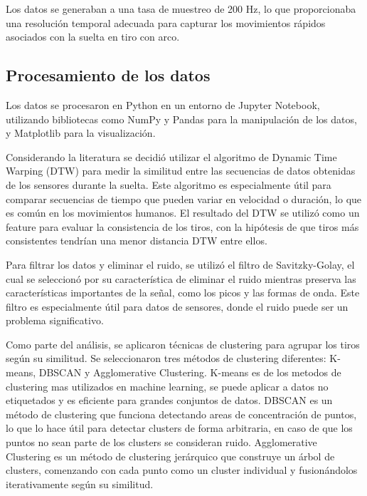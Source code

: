 \documentclass[11pt,a4paper,twocolumn,twoside]{rho-class/rho}
\begin{document}
        Los datos se generaban a una tasa de muestreo de 200 Hz, lo que proporcionaba una resolución temporal adecuada para capturar los movimientos rápidos asociados con la suelta en tiro con arco.


    \subsection{Procesamiento de los datos}

        Los datos se procesaron en Python en un entorno de Jupyter Notebook, utilizando bibliotecas como NumPy y Pandas para la manipulación de los datos, y Matplotlib para la visualización.

        Considerando la literatura se decidió utilizar el algoritmo de Dynamic Time Warping (DTW) para medir la similitud entre las secuencias de datos obtenidas de los sensores durante la suelta. Este algoritmo es especialmente útil para comparar secuencias de tiempo que pueden variar en velocidad o duración, lo que es común en los movimientos humanos. El resultado del DTW se utilizó como un feature para evaluar la consistencia de los tiros, con la hipótesis de que tiros más consistentes tendrían una menor distancia DTW entre ellos.

        Para filtrar los datos y eliminar el ruido, se utilizó el filtro de Savitzky-Golay, el cual se seleccionó por su característica de eliminar el ruido mientras preserva las características importantes de la señal, como los picos y las formas de onda. Este filtro es especialmente útil para datos de sensores, donde el ruido puede ser un problema significativo. \cite{konstantinovskyIntroductionSavitzkyGolayFilter2024}

        Como parte del análisis, se aplicaron técnicas de clustering para agrupar los tiros según su similitud. Se seleccionaron tres métodos de clustering diferentes: K-means, DBSCAN y Agglomerative Clustering.
        K-means es de los metodos de clustering mas utilizados en machine learning, se puede aplicar a datos no etiquetados y es eficiente para grandes conjuntos de datos. \cite{winlandQueEsAgrupacion2024} DBSCAN es un método de clustering que funciona detectando areas de concentración de puntos, lo que lo hace útil para detectar clusters de forma arbitraria, en caso de que los puntos no sean parte de los clusters se consideran ruido. \cite{birantSTDBSCANAlgorithmClustering2007} Agglomerative Clustering es un método de clustering jerárquico que construye un árbol de clusters, comenzando con cada punto como un cluster individual y fusionándolos iterativamente según su similitud. \cite{AgglomerativeClustering}
\end{document}
